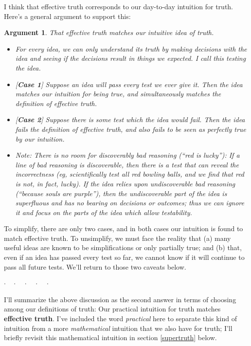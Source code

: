 \documentclass[9pt, twoside]{book}
\newenvironment{answerwnum}[1]
  {\renewcommand\theinnercustomthm{#1}\innercustomthm}
  {\endinnercustomthm}
\theoremstyle{argtstyle}
\newtheorem*{argt}{Argument}
\newcommand{\dotq}{\cdot\quad}
\newcommand{\scenebreak}{
    \medskip\centerline{$\dotq\dotq\dotq\dotq\cdot$}\medskip
}
\begin{document}
I think that effective truth corresponds to our day-to-day intuition for truth.
Here's a general argument to support this:
\begin{argt} That effective truth matches our intuitive idea of truth.
    \normalfont
\begin{itemize}
    \item For every idea, we can only understand its truth by making decisions
        with the idea and seeing if the decisions result in things we expected.
        I call this {\em testing the idea.}
    \item{} [{\bf Case 1}]
        Suppose an idea will pass every test we ever give it. Then
        the idea
        matches our intuition for being true, and simultaneously matches the
        definition of effective truth.
    \item{} [{\bf Case 2}]
        Suppose there is some test which the idea would fail.
        Then the idea fails the definition of
        effective truth, and also fails to be seen as perfectly true by our
        intuition.
    \item{}
        {\em Note:} There is no room for discoverably
        bad reasoning (``red is lucky''):
        If a line of bad reasoning is discoverable,
        then there is a test that can reveal the incorrectness
        (eg, scientifically test all red bowling balls, and we find that red is
        not, in fact, lucky).
        If the idea
        relies upon undiscoverable bad reasoning (``because souls are purple''),
        then the undiscoverable part of the idea is superfluous and has no
        bearing on decisions or outcomes; thus we can ignore it and focus on the
        parts of the idea which allow testability.
\end{itemize}
\end{argt}
To simplify, there are only two cases, and in both cases our intuition is
found to match effective truth. To unsimplify, we must face the reality that (a)
many useful ideas are known to be simplifications or only partially true; and
(b) that, even if an idea has passed every test so far, we cannot know if it
will continue to pass all future tests.
We'll return to those two caveats below.

\scenebreak

I'll summarize the above discussion as the second answer in terms
of choosing among our definitions of truth:
\begin{answerwnum}{B}
    Our practical intuition for truth matches
    \textbf{effective truth}.
\end{answerwnum}
I've included the word {\em practical} here to separate this kind of intuition
from a more {\em mathematical} intuition that we also have for truth;
I'll briefly revisit this mathematical intuition in section \ref{supertruth}
below.
\end{document}
